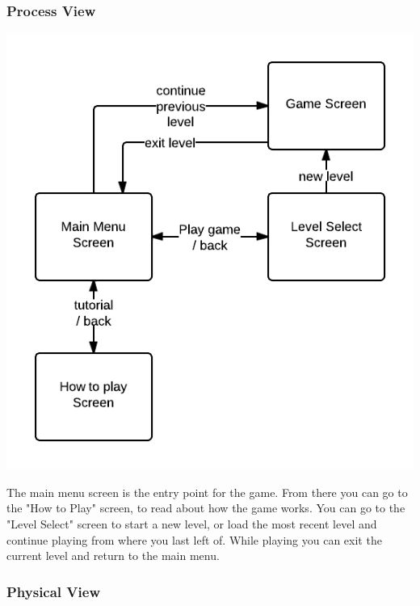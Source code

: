 \subsubsection{Process View} %
\includegraphics[width=\textwidth]{pictures/process_view_screen_flow}

The main menu screen is the entry point for the game. From there you can go to the "How to Play" screen, 
to read about how the game works. You can go to the "Level Select" screen to start a new level, or load the 
most recent level and continue playing from where you last left of. While playing you can exit the current 
level and return to the main menu.

\subsubsection{Physical View} %

